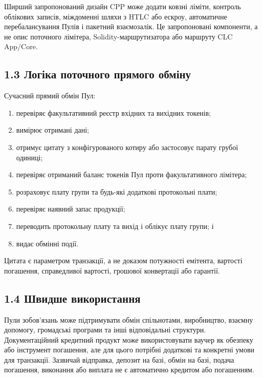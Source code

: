 \documentclass[11pt]{article}
\begin{document}
Ширший запропонований дизайн CPP може додати ковзні ліміти, контроль облікових записів, міждоменні шляхи з HTLC або ескроу, автоматичне перебалансування Пулів і пакетний взаємозалік. Це запропоновані компоненти, а не опис поточного лімітера, Solidity-маршрутизатора або маршруту CLC App/Core.

\subsection*{1.3 Логіка поточного прямого обміну}

Сучасний прямий обмін Пул:

\begin{enumerate}[leftmargin=*]
\item перевіряє факультативний реєстр вхідних та вихідних токенів;
\item вимірює отримані дані;
\item отримує цитату з конфігурованого котиру або застосовує парату грубої одиниці;
\item перевіряє отриманий баланс токенів Пул проти факультативного лімітера;
\item розраховує плату групи та будь-які додаткові протокольні плати;
\item перевіряє наявний запас продукції;
\item переводить протокольну плату та вихід і облікує плату групи; і
\item видає обмінні події.
\end{enumerate}
Цитата є параметром транзакції, а не доказом потужності емітента, вартості погашення, справедливої вартості, грошової конвертації або гарантії.

\subsection*{1.4 Швидше використання}

Пули зобов'язань може підтримувати обмін спільнотами, виробництво, взаємну допомогу, громадські програми та інші відповідальні структури. Документаційний кредитний продукт може використовувати ваучер як обезпеку або інструмент погашення, але для цього потрібні додаткові та конкретні умови для транзакції. Зазвичай відправка, депозит на базі, обмін на базі, подача погашення, виконання або виплата не є автоматично кредитом або погашенням.
\end{document}
